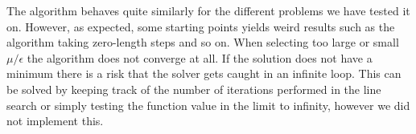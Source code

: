 The algorithm behaves quite similarly for the different problems we have tested it on. However, as expected, some starting points yields weird results such as the algorithm taking zero-length steps and so on. When selecting too large or small $\mu/\epsilon$ the algorithm does not converge at all. 
If the solution does not have a minimum there is a risk that the solver gets caught in an infinite loop. This can be solved by keeping track of the number of iterations performed in the line search or simply testing the function value in the limit to infinity, however we did not implement this.  
